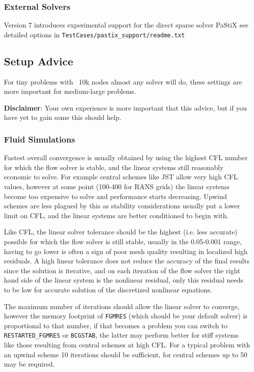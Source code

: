 \documentclass{article}
\begin{document}
\subsubsection{External Solvers}
Version 7 introduces experimental support for the direct sparse solver PaStiX see detailed options in \verb|TestCases/pastix_support/readme.txt|

\subsection{Setup Advice}
For tiny problems with ~10k nodes almost any solver will do, these settings are more important for medium-large problems.

\textbf{Disclaimer}: Your own experience is more important that this advice, but if you have yet to gain some this should help.

\subsubsection{Fluid Simulations}
Fastest overall convergence is usually obtained by using the highest CFL number for which the flow solver is stable, and the linear systems still reasonably economic to solve. For example central schemes like JST allow very high CFL values, however at some point (100-400 for RANS grids) the linear systems become too expensive to solve and performance starts decreasing. Upwind schemes are less plagued by this as stability considerations usually put a lower limit on CFL, and the linear systems are better conditioned to begin with.

Like CFL, the linear solver tolerance should be the highest (i.e. less accurate) possible for which the flow solver is still stable, usually in the 0.05-0.001 range, having to go lower is often a sign of poor mesh quality resulting in localized high residuals. A high linear tolerance does not reduce the accuracy of the final results since the solution is iterative, and on each iteration of the flow solver the right hand side of the linear system is the nonlinear residual, only this residual needs to be low for accurate solution of the discretized nonlinear equations.

The maximum number of iterations should allow the linear solver to converge, however the memory footprint of \verb|FGMRES| (which should be your default solver) is proportional to that number, if that becomes a problem you can switch to \verb|RESTARTED_FGMRES| or \verb|BCGSTAB|, the latter may perform better for stiff systems like those resulting from central schemes at high CFL. For a typical problem with an upwind scheme 10 iterations should be sufficient, for central schemes up to 50 may be required.
\end{document}
